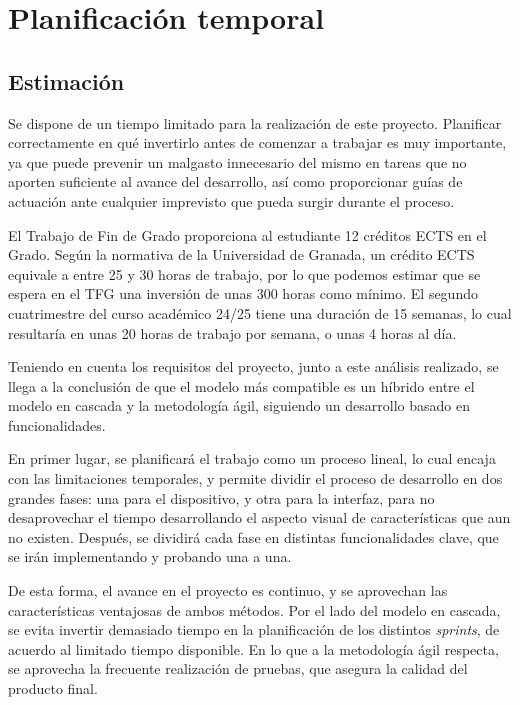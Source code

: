 \chapter{Planificación temporal}
\label{ch:planificacion}

\section{Estimación}

Se dispone de un tiempo limitado para la realización de este proyecto. Planificar correctamente en qué invertirlo antes de comenzar a trabajar es muy importante, ya que puede prevenir un malgasto innecesario del mismo en tareas que no aporten suficiente al avance del desarrollo, así como proporcionar guías de actuación ante cualquier imprevisto que pueda surgir durante el proceso.

El Trabajo de Fin de Grado proporciona al estudiante 12 créditos ECTS en el Grado. Según la normativa de la Universidad de Granada, un crédito ECTS equivale a entre 25 y 30 horas de trabajo, por lo que podemos estimar que se espera en el TFG una inversión de unas 300 horas como mínimo. El segundo cuatrimestre del curso académico 24/25 tiene una duración de 15 semanas, lo cual resultaría en unas 20 horas de trabajo por semana, o unas 4 horas al día.

Teniendo en cuenta los requisitos del proyecto, junto a este análisis realizado, se llega a la conclusión de que el modelo más compatible es un híbrido entre el modelo en cascada y la metodología ágil, siguiendo un desarrollo basado en funcionalidades.

En primer lugar, se planificará el trabajo como un proceso lineal, lo cual encaja con las limitaciones temporales, y permite dividir el proceso de desarrollo en dos grandes fases: una para el dispositivo, y otra para la interfaz, para no desaprovechar el tiempo desarrollando el aspecto visual de características que aun no existen. Después, se dividirá cada fase en distintas funcionalidades clave, que se irán implementando y probando una a una.

De esta forma, el avance en el proyecto es continuo, y se aprovechan las características ventajosas de ambos métodos. Por el lado del modelo en cascada, se evita invertir demasiado tiempo en la planificación de los distintos \textit{sprints}, de acuerdo al limitado tiempo disponible. En lo que a la metodología ágil respecta, se aprovecha la frecuente realización de pruebas, que asegura la calidad del producto final.

